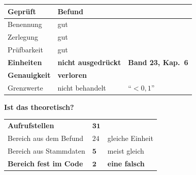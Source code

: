 \begin{merksatz}
\begin{center}
{\small
\renewcommand{\arraystretch}{1.5}
\begin{tabular}{@{}P{3.0cm}P{2.4cm}P{2.6cm}@{}}
\toprule
\textbf{Geprüft} & \textbf{Befund} & \\
\midrule
Benennung & \textcolor{gruen}{gut} & \\
Zerlegung & \textcolor{gruen}{gut} & \\
Prüfbarkeit & \textcolor{gruen}{gut} & \\
\textbf{Einheiten} & \textcolor{akzent}{\textbf{nicht ausgedrückt}} & \textcolor{akzent}{\textbf{Band 23, Kap.~6}}\\
\textbf{Genauigkeit} & \textcolor{akzent}{\textbf{verloren}} & \textcolor{akzent}{}\\
Grenzwerte & \textcolor{akzent}{nicht behandelt} & \enquote{$<0{,}1$}\\
\bottomrule
\end{tabular}}
\end{center}

\begin{center}
\begin{minipage}{0.88\textwidth}
\end{minipage}
\end{center}

\textbf{Ist das theoretisch?}

\begin{center}
\renewcommand{\arraystretch}{1.45}
\begin{tabular}{@{}P{3.0cm}P{2.2cm}P{2.6cm}@{}}
\toprule
\textbf{Aufrufstellen} & $\mathbf{31}$ & \\
Bereich aus dem Befund & $24$ & \textcolor{gruen}{gleiche Einheit}\\
Bereich aus Stammdaten & $\mathbf{5}$ & \textcolor{mittel}{meist gleich}\\
\textbf{Bereich fest im Code} & $\mathbf{2}$ & \textcolor{akzent}{\textbf{eine falsch}}\\
\bottomrule
\end{tabular}
\end{center}

\begin{center}
\end{center}
\end{merksatz}


